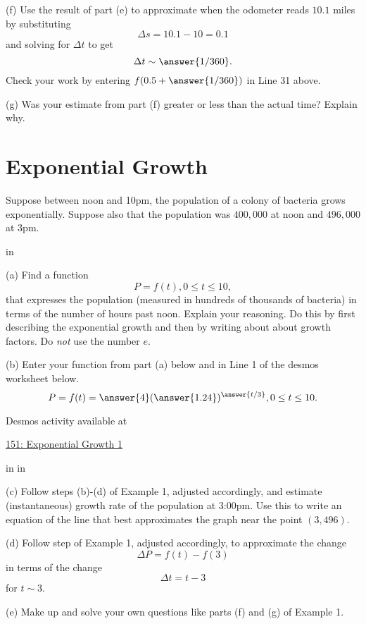 \documentclass{ximera}
\newcommand{\pskip}{\vskip 0.1 in}
\begin{document}
\begin{example}
\begin{question}
(f) Use the result of part (e) to approximate when the odometer reads $10.1$ miles by substituting 
\[
    \Delta s = 10.1 - 10  = 0.1
\]
and solving for $\Delta t$ to get
\[
     \Delta t \sim \answer{1/360} .
\]
Check your work by entering $f(0.5+\answer{1/360})$ in Line 31 above.

(g) Was your estimate from part (f) greater or less than the actual time? Explain why.


\end{question}
\end{example}

\section{Exponential Growth}

\begin{example} \label{Ex9d8gsd8}
Suppose between noon and 10pm, the population of a colony of bacteria grows exponentially. Suppose also that the population was $400,000$ at noon and $496,000$ at 3pm.

\pskip

(a) Find a function
\[
       P = f(t) , 0\leq t \leq 10,
\]
that expresses the population (measured in hundreds of thousands of bacteria) in terms of the number of hours past noon. Explain your reasoning. Do this by first describing the exponential growth and then by writing about about growth factors. Do \emph{not} use the number $e$.
 
\begin{question} \label{Qer45gh54}
(b) Enter your function from part (a) below and in Line 1 of the desmos worksheet below.
\[
    P = f(t) = \answer{4}(\answer{1.24})^{\answer{t/3}} , 0\leq t \leq 10 .
\]


 
\begin{onlineOnly}
    \begin{center}
\end{center}
\end{onlineOnly}

Desmos activity available at

\href{https://www.desmos.com/calculator/ntguz3lsmd}{151: Exponential Growth 1}

\pskip \pskip

(c) Follow steps (b)-(d) of Example 1, adjusted accordingly, and estimate (instantaneous) growth rate of the population at 3:00pm.
Use this to write an equation of the line that best approximates the graph near the point $(3,496)$.

(d) Follow step of Example 1, adjusted accordingly, to approximate the change 
\[
\Delta P = f(t) - f(3)
\]
in terms of the change 
\[
  \Delta t = t-3
\]
for $t\sim 3$. 

(e) Make up and solve your own questions like parts (f) and (g) of Example 1.

\end{question}
\end{example}
\end{document}
